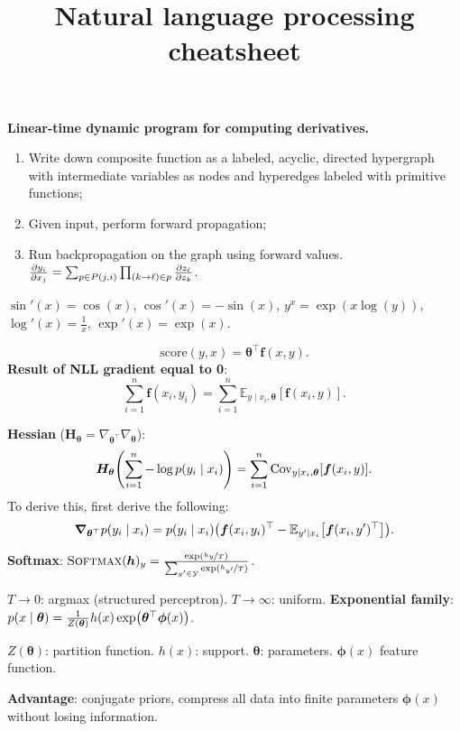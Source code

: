 \documentclass{article}
\title{Natural language processing cheatsheet}
\def\score{\mathrm{score}}
\def\softmax{\textsc{Softmax}}
\newcommand{\lft}{\mathopen{}\left}
\newcommand{\rgt}{\aftergroup\mathclose\aftergroup{\aftergroup}\right}
\newenvironment{topic}[1]
{\begin{tcolorbox}[
  title=#1,
  breakable,
  colback=white,
  colframe=black,
  fonttitle={\bfseries\sffamily},
  sharp corners,
  boxrule=0.5pt,
  boxsep=0.1cm,
  top=0cm,
  bottom=0cm,
  left=0.1cm,
  right=0.1cm,
  enhanced jigsaw,
]}
{\end{tcolorbox}}
\begin{document}
\setlength{\columnsep}{0.1cm}

\begin{multicols}{3}

\begin{topic}{Backpropagation}
  \textbf{Linear-time dynamic program for computing derivatives.}
  \begin{enumerate}
    \item Write down composite function as a labeled, acyclic, directed
      hypergraph with intermediate variables as nodes and hyperedges labeled
      with primitive functions;
    \item Given input, perform forward propagation;
    \item Run backpropagation on the graph using forward values.
      $\pdv{y_i}{x_j} = \sum_{p\in P(j, i)} \prod_{(k\to\ell)\in p}
      \pdv{z_{\ell}}{z_k}$.
  \end{enumerate}

  $\sin'(x) = \cos(x)$, $\cos'(x) = -\sin(x)$, $y^x = \exp(x\log(y))$,
  $\log'(x) = \frac{1}{x}$, $\exp'(x) = \exp(x)$.
\end{topic}

\begin{topic}{Log-linear modelling}
  \[
    \score(y,x) = \bm{\theta}^\top \bm{f}(x,y)
  .\]
  \textbf{Result of NLL gradient equal to 0}: \[
    \sum_{i=1}^n \bm{f}(x_i,y_i) = \sum_{i=1}^n \mathbb{E}_{y\mid x_i,\bm{\theta}}[\bm{f}(x_i,y)]
  .\]

  \textbf{Hessian} ($\bm{H}_{\bm{\theta}} = \nabla_{\bm{\theta}^\top}
  \nabla_{\bm{\theta}}$): \[
    \bm{H}_{\bm{\theta}} \lft( \sum_{i=1}^n -\log p(y_i\mid x_i) \rgt) = \sum_{i=1}^n \mathrm{Cov}_{y\mid x_i,\bm{\theta}}[\bm{f}(x_i,y)]
  .\]
  To derive this, first derive the following: \[
    \bm{\nabla}_{\bm{\theta}^\top} p(y_i\mid x_i) = p(y_i\mid x_i) \lft( \bm{f}(x_i,y_i)^\top - \mathbb{E}_{y'\mid x_i} \lft[ \bm{f}(x_i,y')^\top \rgt] \rgt)
  .\]

  \textbf{Softmax}: $\softmax(\bm{h})_y = \frac{\exp(
  \nicefrac{h_y}{T})}{\sum_{y'\in\mathcal{Y}} \exp(
  \nicefrac{h_{y'}}{T} )}$.

  $T\to 0$: argmax (structured perceptron). $T\to \infty$: uniform.
  \textbf{Exponential family}: $p(x\mid\bm{\theta}) = \frac{1}{Z(\bm{\theta})} h(x) \exp \lft( \bm{\theta}^\top \bm{\phi}(x) \rgt)$.

  $Z(\bm{\theta})$: partition function. $h(x)$: support. $\bm{\theta}$:
  parameters. $\bm{\phi}(x)$ feature function.

  \textbf{Advantage}: conjugate priors, compress all data into finite
  parameters $\bm{\phi}(x)$ without losing information.
\end{topic}


\end{multicols}
\end{document}

